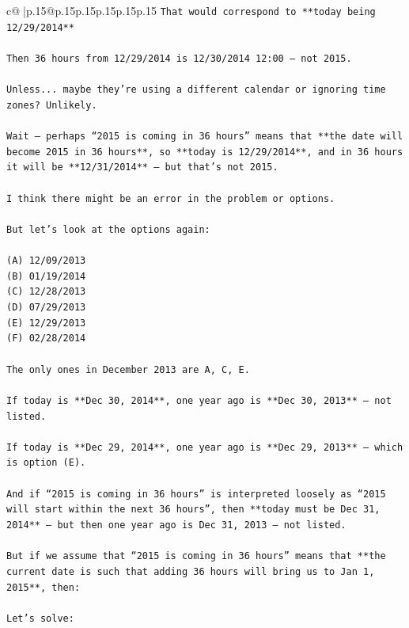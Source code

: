 \documentclass{article}
\begin{document}
{\begin{supertabular}{c@{$\;$}|p{.15\linewidth}@{}p{.15\linewidth}p{.15\linewidth}p{.15\linewidth}p{.15\linewidth}p{.15\linewidth}}
{{{\texttt{That would correspond to **today being 12/29/2014**} \\
\\ 
\texttt{Then 36 hours from 12/29/2014 is 12/30/2014 12:00 — not 2015.} \\
\\ 
\texttt{Unless... maybe they’re using a different calendar or ignoring time zones? Unlikely.} \\
\\ 
\texttt{Wait — perhaps “2015 is coming in 36 hours” means that **the date will become 2015 in 36 hours**, so **today is 12/29/2014**, and in 36 hours it will be **12/31/2014** — but that’s not 2015.} \\
\\ 
\texttt{I think there might be an error in the problem or options.} \\
\\ 
\texttt{But let’s look at the options again:} \\
\\ 
\texttt{(A) 12/09/2013  } \\
\texttt{(B) 01/19/2014  } \\
\texttt{(C) 12/28/2013  } \\
\texttt{(D) 07/29/2013  } \\
\texttt{(E) 12/29/2013  } \\
\texttt{(F) 02/28/2014  } \\
\\ 
\texttt{The only ones in December 2013 are A, C, E.} \\
\\ 
\texttt{If today is **Dec 30, 2014**, one year ago is **Dec 30, 2013** — not listed.} \\
\\ 
\texttt{If today is **Dec 29, 2014**, one year ago is **Dec 29, 2013** — which is option (E).} \\
\\ 
\texttt{And if “2015 is coming in 36 hours” is interpreted loosely as “2015 will start within the next 36 hours”, then **today must be Dec 31, 2014** — but then one year ago is Dec 31, 2013 — not listed.} \\
\\ 
\texttt{But if we assume that “2015 is coming in 36 hours” means that **the current date is such that adding 36 hours will bring us to Jan 1, 2015**, then:} \\
\\ 
\texttt{Let’s solve:} \\
}}}
\end{supertabular}}
\end{document}
